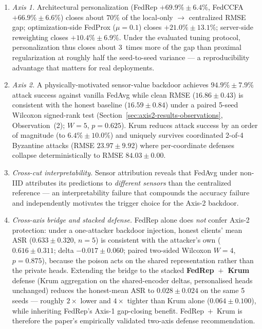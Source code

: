 \documentclass[preprint,12pt,authoryear]{elsarticle}
\begin{document}
\begin{enumerate}
    \item \emph{Axis 1.} Architectural personalization (FedRep
    $+69.9\% \pm 6.4\%$, FedCCFA $+66.9\% \pm 6.6\%$) closes about
    $70\%$ of the local-only $\to$ centralized RMSE gap;
    optimization-side FedProx ($\mu = 0.1$) closes
    $+21.0\% \pm 13.1\%$; server-side reweighting closes
    $+10.4\% \pm 6.9\%$. Under the evaluated tuning protocol,
    personalization thus closes about $3$~times more of the gap
    than proximal regularization at roughly half the seed-to-seed
    variance --- a reproducibility advantage that matters for
    real deployments.

    \item \emph{Axis 2.} A physically-motivated sensor-value
    backdoor achieves $94.9\% \pm 7.9\%$ attack success against
    vanilla FedAvg while clean RMSE ($16.86 \pm 0.43$) is
    consistent with the honest baseline ($16.59 \pm 0.84$) under a
    paired 5-seed Wilcoxon signed-rank test
    (Section~\ref{sec:axis2-results-observations}, Observation~(2);
    $W = 5$, $p = 0.625$). Krum reduces attack success by an order
    of magnitude (to $6.4\% \pm 10.0\%$) and uniquely survives
    coordinated 2-of-4 Byzantine attacks
    (RMSE $23.97 \pm 9.92$) where per-coordinate defenses collapse
    deterministically to RMSE $84.03 \pm 0.00$.

    \item \emph{Cross-cut interpretability.} Sensor attribution
    reveals that FedAvg under non-IID attributes its predictions to
    \emph{different sensors} than the centralized reference --- an
    interpretability failure that compounds the accuracy failure
    and independently motivates the trigger choice for the Axis-2
    backdoor.

    \item \emph{Cross-axis bridge and stacked defense.} FedRep
    alone does \emph{not} confer Axis-2 protection: under a
    one-attacker backdoor injection, honest clients' mean ASR
    ($0.633 \pm 0.320$, $n = 5$) is consistent with the attacker's
    own ($0.616 \pm 0.311$; delta $-0.017 \pm 0.060$; paired
    two-sided Wilcoxon $W = 4$, $p = 0.875$), because the poison
    acts on the shared representation rather than the private
    heads. Extending the bridge to the stacked \textbf{FedRep~$+$~Krum}
    defense (Krum aggregation on the shared-encoder deltas,
    personalised heads unchanged) reduces the honest-mean ASR to
    $\mathbf{0.028 \pm 0.024}$ on the same 5 seeds --- roughly
    $2\times$ lower and $4\times$ tighter than Krum alone
    ($0.064 \pm 0.100$), while inheriting FedRep's Axis-1
    gap-closing benefit. FedRep~$+$~Krum is therefore the paper's
    empirically validated two-axis defense recommendation.
\end{enumerate}
\end{document}
